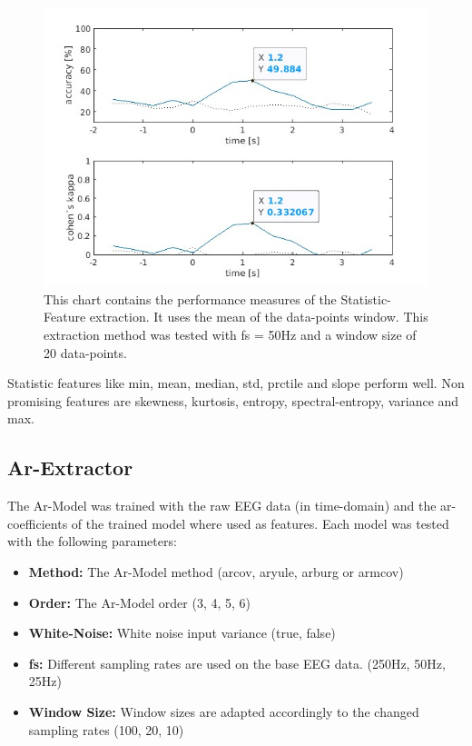 \documentclass{article}
\begin{document}
\begin{figure}[H]
    \centering
    \includegraphics[width=\textwidth]{images/49.88-50hz-20-statistic-mean.jpg}
    \caption{This chart contains the performance measures of the Statistic-Feature extraction. It uses the mean of the data-points window. This extraction method was tested with fs = 50Hz and a window size of 20 data-points.}
\end{figure}

Statistic features like min, mean, median, std, prctile and slope perform well. Non promising features are skewness, kurtosis, entropy, spectral-entropy, variance and max.

\subsection{Ar-Extractor}
The Ar-Model was trained with the raw EEG data (in time-domain) and the ar-coefficients of the trained model where used as features. Each model was tested with the following parameters:
\begin{itemize}
    \item \textbf{Method:} The Ar-Model method (arcov, aryule, arburg or armcov)
    \item \textbf{Order:} The Ar-Model order (3, 4, 5, 6)
    \item \textbf{White-Noise:} White noise input variance (true, false)
    \item \textbf{fs:} Different sampling rates are used on the base EEG data. (250Hz, 50Hz, 25Hz)
    \item \textbf{Window Size:} Window sizes are adapted accordingly to the changed sampling rates (100, 20, 10)
\end{itemize}
\end{document}
